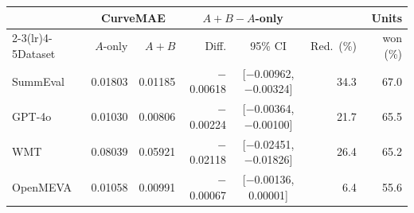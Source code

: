 \begin{tabular}{lrrrcrr}
\toprule
 & \multicolumn{2}{c}{CurveMAE} & \multicolumn{2}{c}{$A{+}B-A$-only} &  & Units \\
\cmidrule(lr){2-3}\cmidrule(lr){4-5}Dataset & $A$-only & $A{+}B$ & Diff. & 95\% CI & Red.\ (\%) & won (\%) \\
\midrule
SummEval & 0.01803 & 0.01185 & $-$0.00618 & [$-$0.00962, $-$0.00324] & 34.3 & 67.0 \\
GPT-4o & 0.01030 & 0.00806 & $-$0.00224 & [$-$0.00364, $-$0.00100] & 21.7 & 65.5 \\
WMT & 0.08039 & 0.05921 & $-$0.02118 & [$-$0.02451, $-$0.01826] & 26.4 & 65.2 \\
OpenMEVA & 0.01058 & 0.00991 & $-$0.00067 & [$-$0.00136, 0.00001] & 6.4 & 55.6 \\
\bottomrule
\end{tabular}
